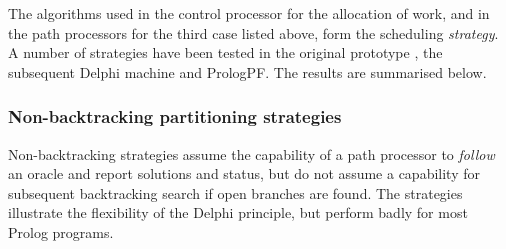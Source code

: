 The algorithms used in the control processor for the allocation of work, and
in the path processors for the third case listed above, form the
scheduling \textit{strategy}.  A number of strategies have been tested in
the original prototype \cite{AM88}, the subsequent Delphi machine \cite{Kle91}
and PrologPF.  The results are summarised below.

\subsubsection{Non-backtracking partitioning strategies}

Non-backtracking strategies assume the capability of a path processor to
\textit{follow} an oracle and report solutions and status, but do not
assume a capability for subsequent backtracking search if open branches are
found.  The strategies illustrate the flexibility of the Delphi principle,
but perform badly for most Prolog programs.
